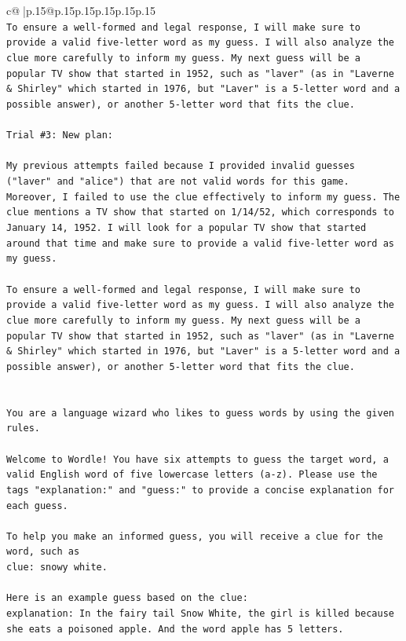 \documentclass{article}
\begin{document}
{\begin{supertabular}{c@{$\;$}|p{.15\linewidth}@{}p{.15\linewidth}p{.15\linewidth}p{.15\linewidth}p{.15\linewidth}p{.15\linewidth}}
{{{\\ 
\texttt{To ensure a well{-}formed and legal response, I will make sure to provide a valid five{-}letter word as my guess. I will also analyze the clue more carefully to inform my guess. My next guess will be a popular TV show that started in 1952, such as "laver" (as in "Laverne \& Shirley" which started in 1976, but "Laver" is a 5{-}letter word and a possible answer), or another 5{-}letter word that fits the clue.} \\
\\ 
\texttt{Trial \#3: New plan: } \\
\\ 
\texttt{My previous attempts failed because I provided invalid guesses ("laver" and "alice") that are not valid words for this game. Moreover, I failed to use the clue effectively to inform my guess. The clue mentions a TV show that started on 1/14/52, which corresponds to January 14, 1952. I will look for a popular TV show that started around that time and make sure to provide a valid five{-}letter word as my guess. } \\
\\ 
\texttt{To ensure a well{-}formed and legal response, I will make sure to provide a valid five{-}letter word as my guess. I will also analyze the clue more carefully to inform my guess. My next guess will be a popular TV show that started in 1952, such as "laver" (as in "Laverne \& Shirley" which started in 1976, but "Laver" is a 5{-}letter word and a possible answer), or another 5{-}letter word that fits the clue.} \\
\\ 
\\ 
\texttt{You are a language wizard who likes to guess words by using the given rules.} \\
\\ 
\texttt{Welcome to Wordle! You have six attempts to guess the target word, a valid English word of five lowercase letters (a{-}z). Please use the tags "explanation:" and "guess:" to provide a concise explanation for each guess.} \\
\\ 
\texttt{To help you make an informed guess, you will receive a clue for the word, such as} \\
\texttt{clue: snowy white.} \\
\\ 
\texttt{Here is an example guess based on the clue:} \\
\texttt{explanation: In the fairy tail Snow White, the girl is killed because she eats a poisoned apple. And the word apple has 5 letters.} \\
}}}
\end{supertabular}}
\end{document}
